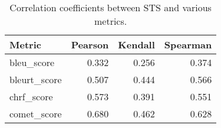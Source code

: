 \begin{table}
\caption{Correlation coefficients between STS and various metrics.}
\label{tab:correlation_table}
\begin{tabular}{lrrr}
\toprule
Metric & Pearson & Kendall & Spearman \\
\midrule
bleu_score & 0.332 & 0.256 & 0.374 \\
bleurt_score & 0.507 & 0.444 & 0.566 \\
chrf_score & 0.573 & 0.391 & 0.551 \\
comet_score & 0.680 & 0.462 & 0.628 \\
\bottomrule
\end{tabular}
\end{table}
